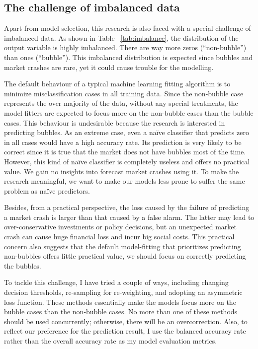 \documentclass[12pt, man, a4paper, floatsintext]{apa7}
\begin{document}
\subsection{The challenge of imbalanced data}

Apart from model selection, this research is also faced with a special challenge of imbalanced data. As shown in Table ~\ref{tab:imbalance}, the distribution of the output variable is highly imbalanced. There are way more zeros (“non-bubble”) than ones (“bubble”). This imbalanced distribution is expected since bubbles and market crashes are rare, yet it could cause trouble for the modelling. 

The default behaviour of a typical machine learning fitting algorithm is to minimize misclassification cases in all training data. Since the non-bubble case represents the over-majority of the data, without any special treatments, the model fitters are expected to focus more on the non-bubble cases than the bubble cases. This behaviour is undesirable because the research is interested in predicting bubbles. As an extreme case, even a naïve classifier that predicts zero in all cases would have a high accuracy rate. Its prediction is very likely to be correct since it is true that the market does not have bubbles most of the time. However, this kind of naïve classifier is completely useless and offers no practical value. We gain no insights into forecast market crashes using it. To make the research meaningful, we want to make our models less prone to suffer the same problem as naïve predictors.

Besides, from a practical perspective, the loss caused by the failure of predicting a market crash is larger than that caused by a false alarm. The latter may lead to over-conservative investments or policy decisions, but an unexpected market crash can cause huge financial loss and incur big social costs. This practical concern also suggests that the default model-fitting that prioritizes predicting non-bubbles offers little practical value, we should focus on correctly predicting the bubbles.

To tackle this challenge, I have tried a couple of ways, including changing decision thresholds, re-sampling for re-weighting, and adopting an asymmetric loss function. These methods essentially make the models focus more on the bubble cases than the non-bubble cases. No more than one of these methods should be used concurrently; otherwise, there will be an overcorrection. Also, to reflect our preference for the prediction result, I use the balanced accuracy rate rather than the overall accuracy rate as my model evaluation metrics.
\end{document}
